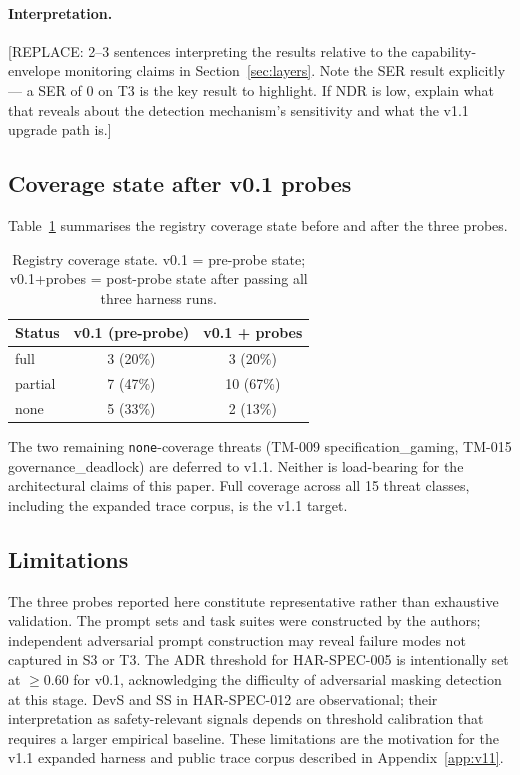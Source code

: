 \paragraph{Interpretation.}
[REPLACE: 2--3 sentences interpreting the results relative to the
capability-envelope monitoring claims in Section~\ref{sec:layers}.
Note the SER result explicitly — a SER of 0 on T3 is the key result
to highlight. If NDR is low, explain what that reveals about the
detection mechanism's sensitivity and what the v1.1 upgrade path is.]


\subsection{Coverage state after v0.1 probes}

Table~\ref{tab:coverage} summarises the registry coverage state before
and after the three probes.

\begin{table}[h]
\centering
\caption{Registry coverage state. v0.1 = pre-probe state; v0.1+probes =
post-probe state after passing all three harness runs.}
\label{tab:coverage}
\begin{tabular}{lcc}
\toprule
Status  & v0.1 (pre-probe) & v0.1 + probes \\
\midrule
full    & 3  (20\%) & 3  (20\%) \\
partial & 7  (47\%) & 10 (67\%) \\
none    & 5  (33\%) & 2  (13\%) \\
\bottomrule
\end{tabular}
\end{table}

The two remaining \texttt{none}-coverage threats (TM-009
specification\_gaming, TM-015 governance\_deadlock) are deferred to
v1.1. Neither is load-bearing for the architectural claims of this paper.
Full coverage across all 15 threat classes, including the expanded trace
corpus, is the v1.1 target.

\subsection{Limitations}

The three probes reported here constitute representative rather than
exhaustive validation. The prompt sets and task suites were constructed
by the authors; independent adversarial prompt construction may reveal
failure modes not captured in S3 or T3. The ADR threshold for HAR-SPEC-005
is intentionally set at $\geq 0.60$ for v0.1, acknowledging the difficulty
of adversarial masking detection at this stage. DevS and SS in
HAR-SPEC-012 are observational; their interpretation as safety-relevant
signals depends on threshold calibration that requires a larger empirical
baseline. These limitations are the motivation for the v1.1 expanded
harness and public trace corpus described in Appendix~\ref{app:v11}.
